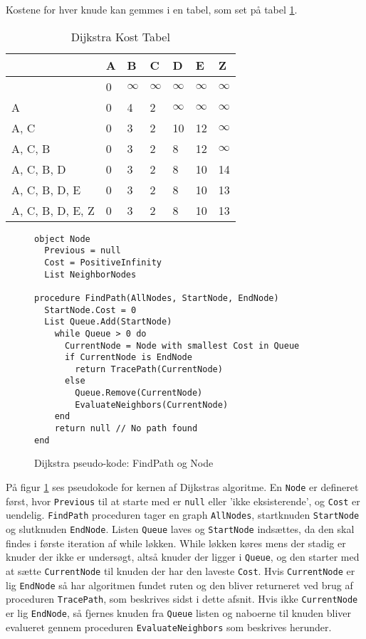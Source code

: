 Kostene for hver knude kan gemmes i en tabel, som set på tabel \ref{dijktabel}.
  
\begin{table}[H]
\centering
  \begin{tabular}{|l|l|l|l|l|l|l|}
  \hline
                   & A & B & C & D  & E  & Z  \\ \hline
                   & 0 & $\infty$ & $\infty$ & $\infty$  & $\infty$  & $\infty$  \\ \hline
  A                & 0 & 4 & 2 & $\infty$  & $\infty$  & $\infty$  \\ \hline
  A, C             & 0 & 3 & 2 & 10 & 12 & $\infty$  \\ \hline
  A, C, B          & 0 & 3 & 2 & 8  & 12 & $\infty$  \\ \hline
  A, C, B, D       & 0 & 3 & 2 & 8  & 10 & 14 \\ \hline
  A, C, B, D, E    & 0 & 3 & 2 & 8  & 10 & 13 \\ \hline
  A, C, B, D, E, Z & 0 & 3 & 2 & 8  & 10 & 13 \\ \hline
  \end{tabular}
\caption{Dijkstra Kost Tabel} \label{dijktabel}
\end{table}

\begin{figure}[H]
\begin{lstlisting}
object Node
  Previous = null
  Cost = PositiveInfinity
  List NeighborNodes

procedure FindPath(AllNodes, StartNode, EndNode)
  StartNode.Cost = 0
  List Queue.Add(StartNode)
    while Queue > 0 do
      CurrentNode = Node with smallest Cost in Queue
      if CurrentNode is EndNode
        return TracePath(CurrentNode)
      else
        Queue.Remove(CurrentNode)
        EvaluateNeighbors(CurrentNode)
    end
    return null // No path found
end
\end{lstlisting}
\caption{Dijkstra pseudo-kode: FindPath og Node}\label{DijkstraCodeFindPathNode}
\end{figure}

På figur \ref{DijkstraCodeFindPathNode} ses pseudokode for kernen af Dijkstras algoritme. En \texttt{Node} er defineret først, hvor \texttt{Previous} til at starte med er \texttt{null} eller 'ikke eksisterende', og \texttt{Cost} er uendelig. \texttt{FindPath} proceduren tager en graph \texttt{AllNodes}, startknuden \texttt{StartNode} og slutknuden \texttt{EndNode}. Listen \texttt{Queue} laves og \texttt{StartNode} indsættes, da den skal findes i første iteration af while løkken. While løkken køres mens der stadig er knuder der ikke er undersøgt, altså knuder der ligger i \texttt{Queue}, og den starter med at sætte \texttt{CurrentNode} til knuden der har den laveste \texttt{Cost}. Hvis \texttt{CurrentNode} er lig \texttt{EndNode} så har algoritmen fundet ruten og den bliver returneret ved brug af proceduren \texttt{TracePath}, som beskrives sidst i dette afsnit. Hvis ikke \texttt{CurrentNode} er lig \texttt{EndNode}, så fjernes knuden fra \texttt{Queue} listen og naboerne til knuden bliver evalueret gennem proceduren \texttt{EvaluateNeighbors} som beskrives herunder.

